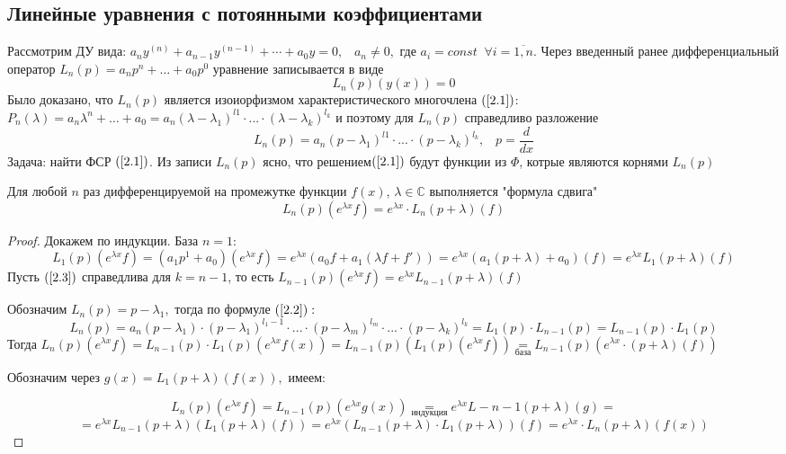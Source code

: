 \subsection{Линейные уравнения с потоянными коэффициентами}
Рассмотрим ДУ вида: $a_n y^{(n)}+a_{n-1}y^{(n-1)} + \cdots +a_0y=0,\;\;\;a_n \neq 0, $ где $a_i=const\;\;\forall i=\overline{1,n}.$ Через введенный ранее дифференциальный оператор $L_n(p)=a_np^n+ \dots + a_0 p^0$ уравнение записывается в виде \begin{equation}\tag{2.1}
\label{2.1}
    L_n(p)(y(x))=0
\end{equation}
Было доказано, что $L_n(p)$ является изоиорфизмом характеристического многочлена $(\ref{2.1})$: $P_n(\lambda)=a_n\lambda^n+\dots+a_0=a_n(\lambda-\lambda_1)^{l1}\cdot ... \cdot (\lambda-\lambda_{k})^{l_k}$ и поэтому для $L_n(p)$ справедливо разложение \begin{equation}
    \tag{2.2}
    \label{2.2}
    L_n(p)=a_n(p-\lambda_1)^{l1}\cdot ... \cdot (p-\lambda_{k})^{l_k},\;\;\;p=\frac{d}{dx}
\end{equation}
Задача: найти ФСР $(\ref{2.1})$. Из записи $L_n(p)$ ясно, что решением$ (\ref{2.1})$ будут функции из $\varPhi$, котрые являются корнями $L_n(p)$
\begin{lemma}
Для любой $n$ раз дифференцируемой на промежутке функции $f(x)$, $\lambda\in\mathds{C}$ выполняется "формула сдвига" \begin{equation}
    \tag{2.3}
    \label{2.3}
    L_n(p)(e^{\lambda x}f)=e^{\lambda x}\cdot L_n(p+\lambda)(f)
\end{equation}  
\end{lemma}
\begin{proof}
Докажем по индукции. База $n=1:$ $$L_1(p)(e^{\lambda x}f)=(a_1p^1+a_0)(e^{\lambda x}f)=e^{\lambda x}(a_0f+a_1(\lambda f+ f'))=e^{\lambda x}(a_1(p+\lambda)+a_0)(f)=e^{\lambda x}L_1(p+\lambda)(f)$$
Пусть $(\ref{2.3})$ справедлива для $k=n-1$, то есть $L_{n-1}(p)(e^{\lambda x} f)=e^{\lambda x} L_{n-1}(p+\lambda)(f)$\par
Обозначим $L_n(p)=p-\lambda_1,$ тогда по формуле $(\ref{2.2}):$
$$L_n(p)=a_n(p-\lambda_1)\cdot (p-\lambda_1)^{l_1-1}\cdot ...\cdot (p-\lambda_m)^{l_m} \cdot ... \cdot (p-\lambda_k)^{l_k}=L_1(p)\cdot L_{n-1}(p)=L_{n-1}(p)\cdot L_1(p)$$
Тогда $L_n(p)(e^{\lambda x }f) = L_{n-1}(p) \cdot L_1(p)(e^{\lambda x}f(x))=L_{n-1}(p)(L_1(p)(e^{\lambda x}f))\underset{\text{база}}{=} L_{n-1}(p)(e^{\lambda x}\cdot (p+\lambda) (f))$\par
Обозначим через $g(x)=L_1(p+\lambda)(f(x)),$ имеем:

$$L_n(p)(e^{\lambda x}f) = L_{n-1}(p)(e^{\lambda x}g(x))\underset{\text{индукция}}{=}e^{\lambda x}L-{n-1}(p+\lambda)(g) = $$ $$ = e^{\lambda x}L_{n-1}(p+\lambda)(L_1(p+\lambda)(f))=e^{\lambda x}(L_{n-1}(p+\lambda)\cdot L_{1}(p+\lambda))(f)=e^{\lambda x}\cdot L_n(p+\lambda)(f(x))$$

\end{proof}

